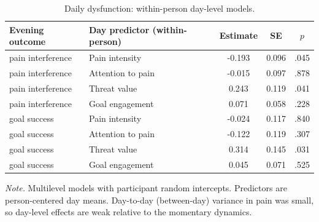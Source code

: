 \begin{table}[!htbp]
\raggedright
\caption{Daily dysfunction: within-person day-level models.}
\label{tab:sup-dysfunction}
\footnotesize
\begingroup
\setlength{\tabcolsep}{4pt}
\renewcommand{\arraystretch}{1.08}
\noindent
\begin{tabular*}{\textwidth}{@{\extracolsep{\fill}}llccc@{}}
\toprule
Evening outcome & Day predictor (within-person) & Estimate & SE & $p$ \\
\midrule
pain interference & Pain intensity & -0.193 & 0.096 & .045 \\
pain interference & Attention to pain & -0.015 & 0.097 & .878 \\
pain interference & Threat value & 0.243 & 0.119 & .041 \\
pain interference & Goal engagement & 0.071 & 0.058 & .228 \\
goal success & Pain intensity & -0.024 & 0.117 & .840 \\
goal success & Attention to pain & -0.122 & 0.119 & .307 \\
goal success & Threat value & 0.314 & 0.145 & .031 \\
goal success & Goal engagement & 0.045 & 0.071 & .525 \\
\bottomrule
\end{tabular*}
\par\vspace{3pt}\noindent\parbox{\textwidth}{\footnotesize\textit{Note.} Multilevel models with participant random intercepts. Predictors are person-centered day means. Day-to-day (between-day) variance in pain was small, so day-level effects are weak relative to the momentary dynamics.}
\endgroup
\end{table}
